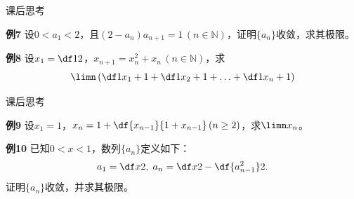 \begin{frame}{课后思考}
	\linespread{1.5}
	\begin{exampleblock}{{\bf 例7}\hfill }
		设$0<a_1<2$，且$(2-a_n)a_{n+1}=1\,(n\in\mathbb{N})$，证明$\{a_n\}$收敛，求其极限。
	\end{exampleblock}
	\pause
	\begin{exampleblock}{{\bf 例8}\hfill }
		设$x_1=\df 12$，$x_{n+1}=x_n^2+x_n\,(n\in\mathbb{N})$，求
		$$\limn\left(\df 1{x_1+1}+\df 1{x_2+1}+\ldots+\df
		1{x_n+1}\right)$$
	\end{exampleblock}
\end{frame}

\begin{frame}{课后思考}
	\linespread{1.5}
	\begin{exampleblock}{{\bf 例9}\hfill }
		设$x_1=1$，$x_n=1+\df{x_{n-1}}{1+x_{n-1}}\,(n\geq 2)$，求$\limn x_n$。
	\end{exampleblock}
	\pause
	\begin{exampleblock}{{\bf 例10}\hfill }
		已知$0<x<1$，数列$\{a_n\}$定义如下：
		$$a_1=\df x2,\;a_n=\df x2-\df{a_{n-1}^2}2.$$
		证明$\{a_n\}$收敛，并求其极限。
	\end{exampleblock}
\end{frame}